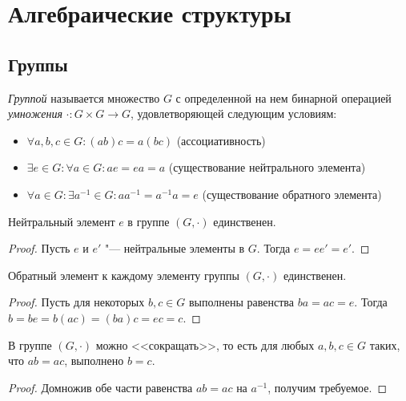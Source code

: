 \section{Алгебраические структуры}

\subsection{Группы}

\begin{definition}
	\textit{Группой} называется множество $G$ с определенной на нем бинарной операцией \textit{умножения} $\cdot: G \times G \rightarrow G$, удовлетворяющей следующим условиям:
	\begin{itemize}
		\item $\forall a, b, c \in G : (ab)c = a(bc)$ (ассоциативность)
		\item $\exists e \in G: \forall a \in G: ae = ea = a$ (существование нейтрального элемента)
		\item $\forall a \in G: \exists a^{-1} \in G: aa^{-1} = a^{-1}a = e$ (существование обратного элемента)
	\end{itemize}
\end{definition}

\begin{proposition}
	Нейтральный элемент $e$ в группе $(G, \cdot)$ единственен.
\end{proposition}

\begin{proof}
	Пусть $e$ и $e'$ "--- нейтральные элементы в $G$. Тогда $e = ee' = e'$.
\end{proof}

\begin{proposition}
	Обратный элемент к каждому элементу группы $(G, \cdot)$ единственен.
\end{proposition}

\begin{proof}
	Пусть для некоторых $b, c \in G$ выполнены равенства $ba = ac = e$. Тогда $b = be = b(ac) = (ba)c = ec = c$.
\end{proof}

\begin{proposition}
	В группе $(G, \cdot)$ можно <<сокращать>>, то есть для любых $a, b, c \in G$ таких, что $ab = ac$, выполнено $b = c$.
\end{proposition}

\begin{proof}
	Домножив обе части равенства $ab = ac$ на $a^{-1}$, получим требуемое.
\end{proof}

